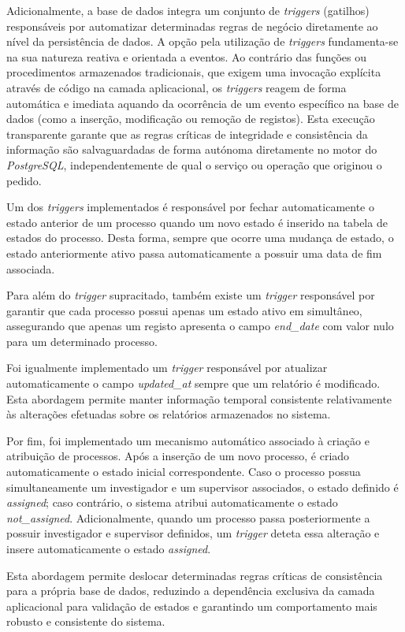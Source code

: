 Adicionalmente, a base de dados integra um conjunto de \textit{triggers} (gatilhos) responsáveis por automatizar determinadas regras de negócio diretamente ao nível da persistência de dados. A opção pela utilização de \textit{triggers} fundamenta-se na sua natureza reativa e orientada a eventos. Ao contrário das funções ou procedimentos armazenados tradicionais, que exigem uma invocação explícita através de código na camada aplicacional, os \textit{triggers} reagem de forma automática e imediata aquando da ocorrência de um evento específico na base de dados (como a inserção, modificação ou remoção de registos). Esta execução transparente garante que as regras críticas de integridade e consistência da informação são salvaguardadas de forma autónoma diretamente no motor do \textit{PostgreSQL}, independentemente de qual o serviço ou operação que originou o pedido.

Um dos \textit{triggers} implementados é responsável por fechar automaticamente o estado anterior de um processo quando um novo estado é inserido na tabela de estados do processo. Desta forma, sempre que ocorre uma mudança de estado, o estado anteriormente ativo passa automaticamente a possuir uma data de fim associada.

Para além do \textit{trigger} supracitado, também existe um \textit{trigger} responsável por garantir que cada processo possui apenas um estado ativo em simultâneo, assegurando que apenas um registo apresenta o campo \textit{end\_date} com valor nulo para um determinado processo.

Foi igualmente implementado um \textit{trigger} responsável por atualizar automaticamente o campo \textit{updated\_at} sempre que um relatório é modificado. Esta abordagem permite manter informação temporal consistente relativamente às alterações efetuadas sobre os relatórios armazenados no sistema.

Por fim, foi implementado um mecanismo automático associado à criação e atribuição de processos. Após a inserção de um novo processo, é criado automaticamente o estado inicial correspondente. Caso o processo possua simultaneamente um investigador e um supervisor associados, o estado definido é \textit{assigned}; caso contrário, o sistema atribui automaticamente o estado \textit{not\_assigned}. Adicionalmente, quando um processo passa posteriormente a possuir investigador e supervisor definidos, um \textit{trigger} deteta essa alteração e insere automaticamente o estado \textit{assigned}.

Esta abordagem permite deslocar determinadas regras críticas de consistência para a própria base de dados, reduzindo a dependência exclusiva da camada aplicacional para validação de estados e garantindo um comportamento mais robusto e consistente do sistema.
\newpage



